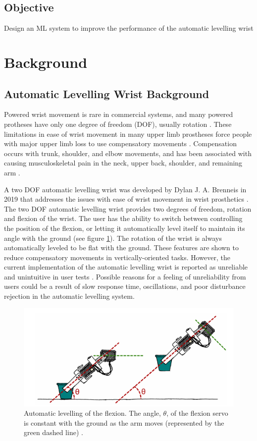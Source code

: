 \documentclass[letterpaper,12pt]{article}
\begin{document}
\subsection{Objective}
Design an ML system to improve the performance of the automatic levelling wrist


\section{Background}
\subsection{Automatic Levelling Wrist Background}
Powered wrist movement is rare in commercial systems, and many powered protheses have only one degree of freedom (DOF), usually rotation \cite{n.m.bajaj}. These limitations in ease of wrist movement in many upper limb prostheses force people with major upper limb loss to use compensatory movements \cite{s.l.carey}. Compensation occurs with trunk, shoulder, and elbow movements, and has been associated with causing musculoskeletal pain in the neck, upper back, shoulder, and remaining arm \cite{k.ostlie}.

A two DOF automatic levelling wrist was developed by Dylan J. A. Brenneis in 2019 that addresses the issues with ease of wrist movement in wrist prosthetics \cite{d.j.a.brenneis}. The two DOF automatic levelling wrist provides two degrees of freedom, rotation and flexion of the wrist. The user has the ability to switch between controlling the position of the flexion, or letting it automatically level itself to maintain its angle with the ground (see figure \ref{fig:auto_levelling}). The rotation of the wrist is always automatically leveled to be flat with the ground. These features are shown to reduce compensatory movements in vertically-oriented tasks. However, the current implementation of the automatic levelling wrist is reported as unreliable and unintuitive in user tests \cite{d.j.a.brenneis}. Possible reasons for a feeling of unreliability from users could be a result of slow response time, oscillations, and poor disturbance rejection in the automatic levelling system.

\begin{figure}[H]
\centering \includegraphics[width=0.8\columnwidth]{auto_levelling.png}
\caption{\label{fig:auto_levelling}Automatic levelling of the flexion. The angle, $\theta$, of the flexion servo is constant with the ground as the arm moves (represented by the green dashed line) \cite{d.j.a.brenneis}.}
\end{figure}
\end{document}
